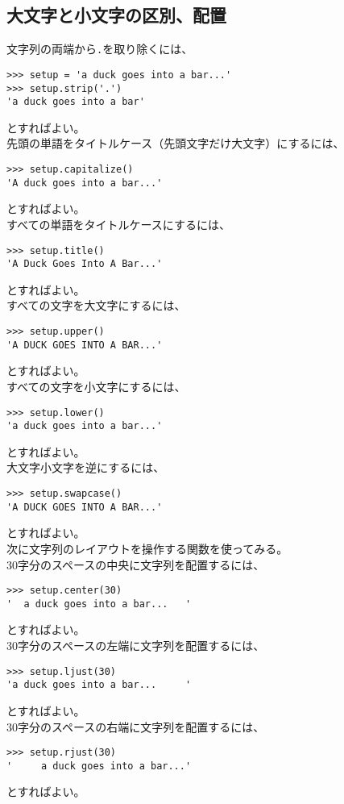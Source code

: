 \documentclass[11pt, oneside]{article}   	%
\begin{document}
   \subsection{大文字と小文字の区別、配置}
   文字列の両端から\verb|.|を取り除くには、
\begin{lstlisting}
>>> setup = 'a duck goes into a bar...'
>>> setup.strip('.')
'a duck goes into a bar'
\end{lstlisting}
  とすればよい。\\
  先頭の単語をタイトルケース（先頭文字だけ大文字）にするには、
\begin{lstlisting}
>>> setup.capitalize()
'A duck goes into a bar...'
\end{lstlisting}
  とすればよい。\\
 すべての単語をタイトルケースにするには、
 \begin{lstlisting}
>>> setup.title()
'A Duck Goes Into A Bar...'
\end{lstlisting}
  とすればよい。\\
 すべての文字を大文字にするには、
  \begin{lstlisting}
>>> setup.upper()
'A DUCK GOES INTO A BAR...'
\end{lstlisting}
  とすればよい。\\
 すべての文字を小文字にするには、
  \begin{lstlisting}
>>> setup.lower()
'a duck goes into a bar...'
\end{lstlisting}
  とすればよい。\\
  大文字小文字を逆にするには、
    \begin{lstlisting}
>>> setup.swapcase()
'A DUCK GOES INTO A BAR...'
\end{lstlisting}
  とすればよい。\\
  次に文字列のレイアウトを操作する関数を使ってみる。\\
  30字分のスペースの中央に文字列を配置するには、
      \begin{lstlisting}
>>> setup.center(30)
'  a duck goes into a bar...   '
\end{lstlisting}
  とすればよい。\\
    30字分のスペースの左端に文字列を配置するには、
      \begin{lstlisting}
>>> setup.ljust(30)
'a duck goes into a bar...     '
\end{lstlisting}
  とすればよい。\\
     30字分のスペースの右端に文字列を配置するには、
      \begin{lstlisting}
>>> setup.rjust(30)
'     a duck goes into a bar...'
\end{lstlisting}
  とすればよい。\\
  
\end{document}
